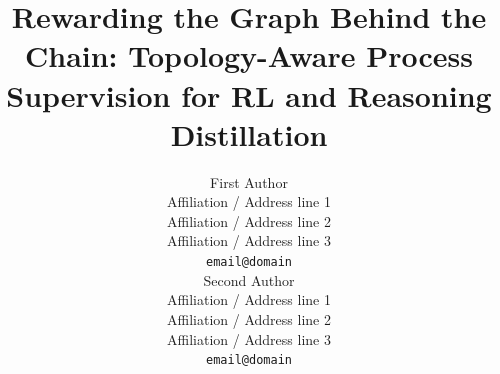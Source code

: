 \documentclass[11pt]{article}
\title{Rewarding the Graph Behind the Chain: Topology-Aware Process Supervision for RL and Reasoning Distillation}
\author{First Author \\
  Affiliation / Address line 1 \\
  Affiliation / Address line 2 \\
  Affiliation / Address line 3 \\
  \texttt{email@domain} \\\And
  Second Author \\
  Affiliation / Address line 1 \\
  Affiliation / Address line 2 \\
  Affiliation / Address line 3 \\
  \texttt{email@domain} \\}
\begin{document}
\maketitle










\appendix
\clearpage
\onecolumn

\end{document}

